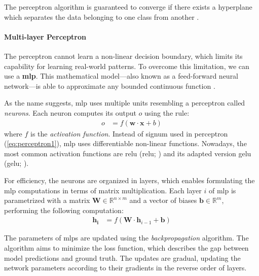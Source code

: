 The perceptron algorithm is guaranteed to converge if there exists a hyperplane which separates the data belonging to one class from another \cite{novikoff1962convergence}.

\paragraph{Multi-layer Perceptron} The perceptron cannot learn a non-linear decision boundary, which limits its capability for learning real-world patterns. To overcome this limitation, we can use a \textbf{\ac{mlp}}. This mathematical model---also known as a feed-forward neural network---is able to approximate any bounded continuous function \cite{hornik1989multilayer}.

As the name suggests, \ac{mlp} uses multiple units resembling a perceptron called \textit{neurons}. Each neuron computes its output $o$ using the rule:
\begin{align}
    o & = f(\mathbf{w} \cdot \mathbf{x} + b)
\end{align}
where $f$ is the \textit{activation function}. Instead of signum used in perceptron (\autoref{eq:perceptron1}), \ac{mlp} uses differentiable non-linear functions. Nowadays, the most common activation functions are \acl{relu} (\acs{relu}; \citealp{nair2010rectified}) and its adapted version \acl{gelu} (\acs{gelu}; \citealp{hendrycks2016gaussian}).

For efficiency, the neurons are organized in layers, which enables formulating the \ac{mlp} computations in terms of matrix multiplication. Each layer $i$ of \ac{mlp} is parametrized with a matrix $\mathbf{W} \in \mathbb{R}^{n\times m}$ and a vector of biases $\mathbf{b} \in \mathbb{R}^{m}$, performing the following computation:
\begin{align}
    \mathbf{h_i} & = f(\textbf{W} \cdot \mathbf{h}_{i-1} + \mathbf{b})
\end{align}

The parameters of \acp{mlp} are updated using the \textit{backpropagation} algorithm. The algorithm aims to minimize the loss function, which describes the gap between model predictions and ground truth. The updates are gradual, updating the network parameters according to their gradients in the reverse order of layers.

